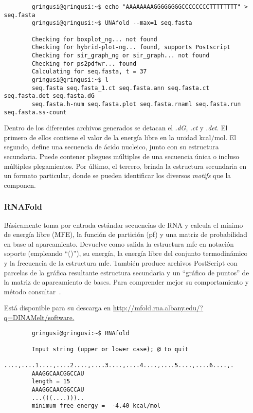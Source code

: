 {\scriptsize
	\begin{verbatim}
        gringusi@gringusi:~$ echo "AAAAAAAAGGGGGGGGCCCCCCCCTTTTTTTT" > seq.fasta
        gringusi@gringusi:~$ UNAfold --max=1 seq.fasta

        Checking for boxplot_ng... not found
        Checking for hybrid-plot-ng... found, supports Postscript
        Checking for sir_graph_ng or sir_graph... not found
        Checking for ps2pdfwr... found
        Calculating for seq.fasta, t = 37
        gringusi@gringusi:~$ l
        seq.fasta seq.fasta_1.ct seq.fasta.ann seq.fasta.ct seq.fasta.det seq.fasta.dG 
        seq.fasta.h-num seq.fasta.plot seq.fasta.rnaml seq.fasta.run seq.fasta.ss-count
    \end{verbatim}
}

Dentro de los diferentes archivos generados se detacan el \emph{.dG}, \emph{.ct} y \emph{.det}. El primero de ellos contiene el valor de la energía libre en la unidad kcal/mol. El segundo,  define una secuencia de ácido nucleico, junto con su estructura secundaria. Puede contener pliegues múltiples de una secuencia única o incluso múltiples plegamientos. Por último, el tercero, brinda la estructura secundaria en un formato particular, donde se pueden identificar los diversos \emph{motifs} que la componen.

\subsubsection{RNAFold}
\label{rnafold}
\par Básicamente toma por entrada estándar secuencias de RNA y calcula el mínimo de energía libre (MFE), la función de partición (pf) y una matriz de probabilidad en base al apareamiento. Devuelve como salida la estructura mfe en notación soporte (empleando ``()''), su energía, la energía libre del conjunto termodinámico y la frecuencia de la estructura mfe. También produce archivos PostScript con parcelas de la gráfica resultante estructura secundaria y un ``gráfico de puntos'' de la matriz de apareamiento de bases. Para comprender mejor su comportamiento y método consultar~\cite{vienna}.

\par Está disponible para su descarga en \url{http://mfold.rna.albany.edu/?q=DINAMelt/software.}

{\scriptsize
	\begin{verbatim}
        gringusi@gringusi:~$ RNAfold

        Input string (upper or lower case); @ to quit
        ....,....1....,....2....,....3....,....4....,....5....,....6....,.
        AAAGGCAACGGCCAU
        length = 15
        AAAGGCAACGGCCAU
        ...(((....))).. 
        minimum free energy =  -4.40 kcal/mol
	\end{verbatim}
}

